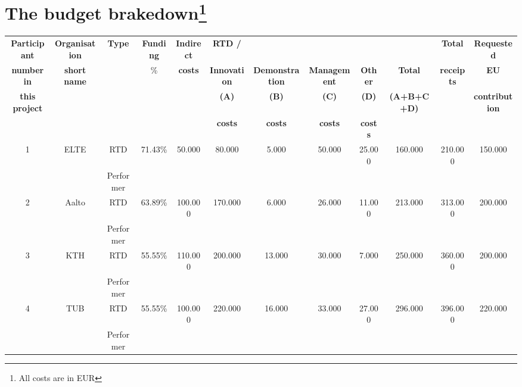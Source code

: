 \section{The budget brakedown\footnote{All costs are in EUR}}

\begin{table}[hbpt]\centering
	\begin{adjustbox}{width=1\textwidth}
		\begin{tabular}{ |c|c|c|c|c|c|c|c|c|c|c|c|} 
			\hline
			\textbf{Participant} & \textbf{Organisation} & \textbf{Type} & \textbf{Funding} & \textbf{Indirect} & \textbf{RTD /} & ~ & ~ & ~ & \textbf{~} & \textbf{Total} & \textbf{Requested}\\
			
			\textbf{number in} & \textbf{short name} & ~ & \% & \textbf{costs} & \textbf{Innovation} & \textbf{Demonstration} & \textbf{Management} & \textbf{Other} & \textbf{Total} & \textbf{receipts} & \textbf{EU} \\
			
			\textbf{this project} & ~ & ~ & ~ & ~ & \textbf{(A)} & \textbf{(B)} & \textbf{(C)} & \textbf{(D)} & \textbf{(A+B+C+D)} & ~ & \textbf{contribution} \\
			
			~ & ~ & ~ & ~ & ~ & \textbf{costs} & \textbf{costs} & \textbf{costs} & \textbf{costs} & ~ & ~ & ~ \\
			\hline
			
			1 & ELTE & RTD & 71.43\% & 50.000 & 80.000 & 5.000 & 50.000 & 25.000 & 160.000 & 210.000 & 150.000 \\
			~ & ~ & Performer & ~ & ~ & ~ & ~ & ~ & ~ & ~ & ~ & \\
			\hline
			
			2 & Aalto & RTD & 63.89\% & 100.000 & 170.000 & 6.000 & 26.000 & 11.000 & 213.000 & 313.000 & 200.000 \\
			~ & ~ & Performer & ~ & ~ & ~ & ~ & ~ & ~ & ~ & ~ & \\
			\hline
			
			3 & KTH & RTD & 55.55\% & 110.000 & 200.000 & 13.000 & 30.000 & 7.000 & 250.000 & 360.000 & 200.000 \\
			~ & ~ & Performer & ~ & ~ & ~ & ~ & ~ & ~ & ~ & ~ &\\
			\hline
			
			4 & TUB & RTD & 55.55\% & 100.000 & 220.000 & 16.000 & 33.000 & 27.000 & 296.000 & 396.000 & 220.000 \\
			~ & ~ & Performer & ~ & ~ & ~ & ~ & ~ & ~ & ~ & ~ & \\
			\hline
			

\end{tabular}
\end{adjustbox}
\end{table}
